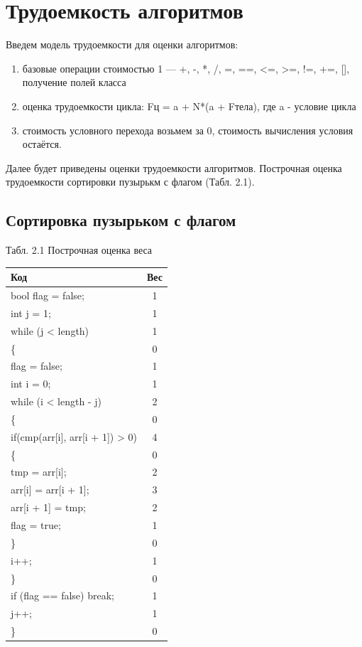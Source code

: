 \documentclass{report}
\begin{document}
\section{Трудоемкость алгоритмов}
Введем модель трудоемкости для оценки алгоритмов:
\begin{enumerate}
  	\item  базовые операции стоимостью 1 — +, -, *, /, =, ==, <=, >=, !=, +=, [], получение полей класса
	\item оценка трудоемкости цикла: Fц = a + N*(a + Fтела), где a - условие цикла
	\item стоимость условного перехода возьмем за 0, стоимость вычисления условия остаётся.
\end{enumerate}

Далее будет приведены оценки трудоемкости алгоритмов. Построчная оценка трудоемкости сортировки пузырькм с флагом (Табл. 2.1).

\subsection{Сортировка пузырьком с флагом}
\begin{center}
Табл. 2.1 Построчная оценка веса
	\begin{tabular}{|l c|} 
 	\hline
	Код & Вес \\ [0.5ex] 
 	\hline
	bool flag = false; & 1\\
	\hline
	int j = 1; & 1\\
 	\hline
	while (j < length) & 1\\
	\hline
	\{ & 0\\
	\hline
	flag = false; & 1\\
	\hline
	int i = 0; & 1\\
 	\hline
	while (i < length - j) & 2\\
	\hline
	\{ & 0\\	
	\hline
	if(cmp(arr[i], arr[i + 1]) > 0) & 4\\
	\hline
	\{ & 0\\
	\hline
	tmp = arr[i]; & 2\\
	\hline
    arr[i] = arr[i + 1]; & 3\\
    \hline
    arr[i + 1] = tmp; & 2\\
    \hline
    flag = true; & 1\\
    \hline
    \} & 0\\
	\hline
	i++; & 1\\
	\hline
	\} & 0\\
	\hline
	if (flag == false) break;  & 1\\
	\hline
	j++; & 1\\
	\hline
	\} & 0\\
	\hline
	\end{tabular}
\end{center}
\end{document}
